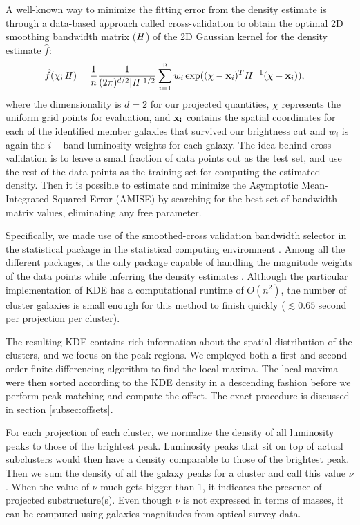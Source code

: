 A well-known way to minimize the fitting error from the density estimate is through
a data-based approach called cross-validation to obtain 
the optimal 2D smoothing
bandwidth matrix ($\mathbf{\it H}$) of the 2D Gaussian kernel for the
density estimate $\hat{f}$:
\begin{align}
	\hat{f}(\chi; \mathbf{\it H}) &= \frac{1}{n} \frac{1}{(2\pi)^{d/2}|\mathbf{\it H}|^{1/2}}
	\sum_{i=1}^n w_i \exp((\chi-{\bf x}_i)^T H^{-1} (\chi-{\bf x}_i)),
	\label{eq:cross_validated_bandwidth}
\end{align}
where the dimensionality is $d=2$ for our projected quantities,
$\chi$ represents the uniform grid points for evaluation, and 
$\bf{x}_i$ contains the spatial coordinates for each of the identified member 
galaxies that survived our brightness cut and $w_i$ is again the $i-$band
luminosity weights for each galaxy.
The idea behind cross-validation is to leave a small fraction of data points 
out as the test set, and use the rest of the data points as 
the training set for computing the estimated density.
Then it is possible to estimate and minimize the Asymptotic Mean-Integrated Squared Error
(AMISE)  by searching
for the best set of bandwidth matrix values, eliminating any free parameter. 

Specifically, we made use of the smoothed-cross validation \citep{Hall1992} 
bandwidth selector in the statistical package {} \citep{Duong2007} 
in the {} statistical computing environment \citep{R_core}. 
Among all the different {} packages, {} is the
only package capable of handling the magnitude weights of the data points 
while inferring the density estimates \citep{Deng2011}. 
Although the particular implementation of KDE has a computational runtime of $O(n^2)$, 
the number of cluster galaxies is
small enough for this method to finish quickly ($\lesssim 0.65$ second per
projection per cluster). 

The resulting KDE contains rich information about the spatial distribution of
the clusters, and we focus on the peak regions.  
We employed both a first and second-order  
finite differencing algorithm to find the local maxima.  
The local maxima were then sorted according to the KDE density in a descending
fashion before we perform peak matching and compute the offset. The exact
procedure is discussed in section \ref{subsec:offsets}. 

For each projection of each cluster, we normalize the density of all 
luminosity peaks to those of the brightest peak. 
Luminosity peaks that sit on top of actual subclusters would then have a density 
comparable to those of the brightest peak. 
Then we sum the density of all the galaxy peaks for a cluster and call this value
$\nu$. When the value of $\nu$ much gets bigger than 1, it indicates the presence 
of projected substructure(s). Even though 
$\nu$ is not expressed in terms of masses, it can be computed using galaxies
magnitudes from optical survey data. 

